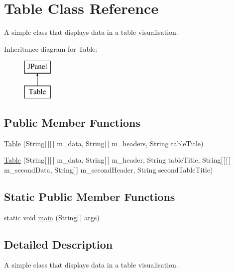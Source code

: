 \hypertarget{class_table}{\section{Table Class Reference}
\label{class_table}
}


A simple class that displays data in a table visualisation.  


Inheritance diagram for Table\-:\begin{figure}[H]
\begin{center}
\leavevmode
\includegraphics[height=2.000000cm]{class_table}
\end{center}
\end{figure}
\subsection*{Public Member Functions}
\begin{DoxyCompactItemize}
\item 
\hyperlink{class_table_a55d3afc76dfd94c753fc7e8086c0c02d}{Table} (String\mbox{[}$\,$\mbox{]}\mbox{[}$\,$\mbox{]} m\-\_\-data, String\mbox{[}$\,$\mbox{]} m\-\_\-headers, String table\-Title)
\item 
\hyperlink{class_table_ac32e2c58f437c8ee3d576766d2a0f5f8}{Table} (String\mbox{[}$\,$\mbox{]}\mbox{[}$\,$\mbox{]} m\-\_\-data, String\mbox{[}$\,$\mbox{]} m\-\_\-header, String table\-Title, String\mbox{[}$\,$\mbox{]}\mbox{[}$\,$\mbox{]} m\-\_\-second\-Data, String\mbox{[}$\,$\mbox{]} m\-\_\-second\-Header, String second\-Table\-Title)
\end{DoxyCompactItemize}
\subsection*{Static Public Member Functions}
\begin{DoxyCompactItemize}
\item 
static void \hyperlink{class_table_a1484279c07eaa8220aa52c7036d6a2cf}{main} (String\mbox{[}$\,$\mbox{]} args)
\end{DoxyCompactItemize}


\subsection{Detailed Description}
A simple class that displays data in a table visualisation. 

